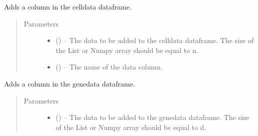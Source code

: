 \documentclass[letterpaper,10pt,english]{sphinxmanual}
\begin{document}
\begin{fulllineitems}
\begin{fulllineitems}
\label{\detokenize{index:singlecelldata.SingleCell.addCellData}}
Adds a column in the celldata dataframe.
\begin{quote}\begin{description}
\item[{Parameters}] \leavevmode\begin{itemize}
\item {} 
 () – The data to be added to the celldata dataframe. The size of the List
or Numpy array should be equal to n.

\item {} 
 () – The name of the data column.

\end{itemize}

\end{description}\end{quote}

\end{fulllineitems}


\begin{fulllineitems}
\label{\detokenize{index:singlecelldata.SingleCell.addGeneData}}
Adds a column in the genedata dataframe.
\begin{quote}\begin{description}
\item[{Parameters}] \leavevmode\begin{itemize}
\item {} 
 () – The data to be added to the genedata dataframe. The size of the List
or Numpy array should be equal to d.


\end{itemize}
\end{description}
\end{quote}
\end{fulllineitems}
\end{fulllineitems}
\end{document}
